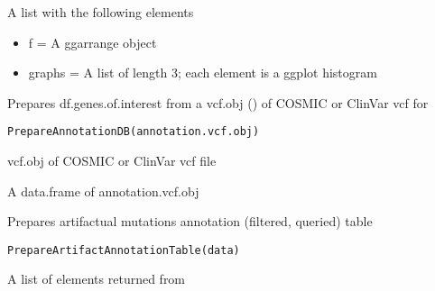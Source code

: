 \documentclass[letterpaper]{book}
\begin{document}
%
\begin{Value}
A list with the following elements
\begin{itemize}

\item{} f = A ggarrange object
\item{} graphs = A list of length 3; each element is a ggplot histogram

\end{itemize}

\end{Value}
%
\begin{Description}\relax
Prepares df.genes.of.interest from a vcf.obj ()
of COSMIC or ClinVar vcf for 
\end{Description}
%
\begin{Usage}
\begin{verbatim}
PrepareAnnotationDB(annotation.vcf.obj)
\end{verbatim}
\end{Usage}
%
\begin{Arguments}
\begin{ldescription}
\item[\code{annotation.vcf.obj}] vcf.obj of COSMIC or ClinVar vcf file
\end{ldescription}
\end{Arguments}
%
\begin{Value}
A data.frame of annotation.vcf.obj
\end{Value}
%
\begin{Description}\relax
Prepares artifactual mutations annotation (filtered, queried) table
\end{Description}
%
\begin{Usage}
\begin{verbatim}
PrepareArtifactAnnotationTable(data)
\end{verbatim}
\end{Usage}
%
\begin{Arguments}
\begin{ldescription}
\item[\code{data}] A list of elements returned from 
\end{ldescription}
\end{Arguments}
\end{document}
